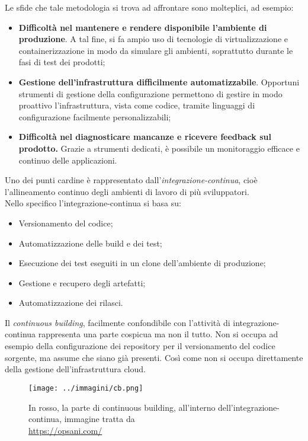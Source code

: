 Le sfide che tale metodologia si trova ad affrontare sono molteplici, ad esempio:

\begin{itemize}
    \item \textbf{Difficoltà nel mantenere e rendere disponibile l'ambiente di produzione}. A tal fine, si fa ampio uso di tecnologie di virtualizzazione e containerizzazione in modo da simulare gli ambienti, soprattutto durante le fasi di test dei prodotti;
    \item \textbf{Gestione dell'infrastruttura difficilmente automatizzabile}. Opportuni strumenti di gestione della configurazione permettono di gestire in modo proattivo l'infrastruttura, vista come codice, tramite linguaggi di configurazione facilmente personalizzabili;
    \item \textbf{Difficoltà nel diagnosticare mancanze e ricevere feedback sul prodotto.} Grazie a strumenti dedicati, è possibile un monitoraggio efficace e continuo delle applicazioni.  
\end{itemize}

Uno dei punti cardine è rappresentato dall'\textit{\gls{integrazione-continua}}, cioè l'allineamento continuo degli ambienti di lavoro di più sviluppatori. \\
Nello specifico l'\gls{integrazione-continua} si basa su:

\begin{itemize}
    \item Versionamento del codice;
    \item Automatizzazione delle build e dei test;
    \item Esecuzione dei test eseguiti in un clone dell'ambiente di produzione;
    \item Gestione e recupero degli artefatti;
    \item Automatizzazione dei rilasci.
\end{itemize} 

Il \textit{\gls{continuous building}}, facilmente confondibile con l'attività di \gls{integrazione-continua}
rappresenta una parte cospicua ma non il tutto. Non si occupa ad esempio della configurazione dei \gls{repository} per il versionamento del codice sorgente, ma assume che siano già presenti. Così come non si occupa direttamente della gestione dell'infrastruttura \gls{cloud}.

\begin{figure}[H]
    \capstart
    \centering
    \texttt{[image: ../immagini/cb.png]}
    \caption[Integrazione Continua e \gls{continuous building}]{In rosso, la parte di \gls{continuous building}, all'interno dell'\gls{integrazione-continua}, immagine tratta da \\ \url{https://opsani.com/}}
\end{figure}
 
